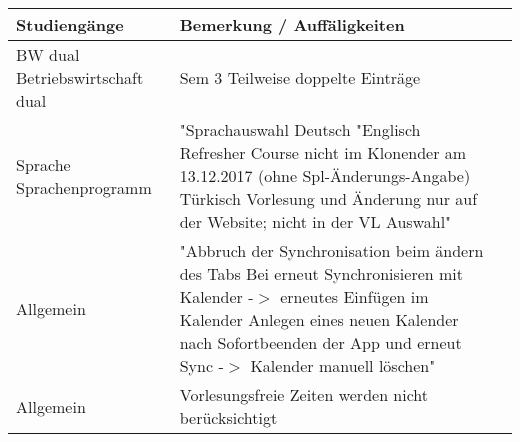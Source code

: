 \noindent%
\begin{tabularx}{\textwidth}{|p{}|X|X| }
\hline
\textbf{Studiengänge} &\textbf{Bemerkung / Auffäligkeiten}   \\ \hline 

BW dual  Betriebswirtschaft dual & 
Sem 3 Teilweise doppelte Einträge  \\ \hline

Sprache  Sprachenprogramm & 
"Sprachauswahl Deutsch
"Englisch Refresher Course nicht im Klonender am 13.12.2017 (ohne Spl-Änderungs-Angabe)
Türkisch Vorlesung und Änderung nur auf der Website; nicht in der VL Auswahl"   \\ \hline
Allgemein & "Abbruch der Synchronisation beim ändern des Tabs 
Bei erneut Synchronisieren mit Kalender -$>$ erneutes Einfügen im Kalender 
Anlegen eines neuen Kalender nach Sofortbeenden der App und erneut Sync
-$>$ Kalender manuell löschen"  \\ \hline
Allgemein & Vorlesungsfreie Zeiten werden nicht berücksichtigt  \\ \hline
\end{tabularx}



